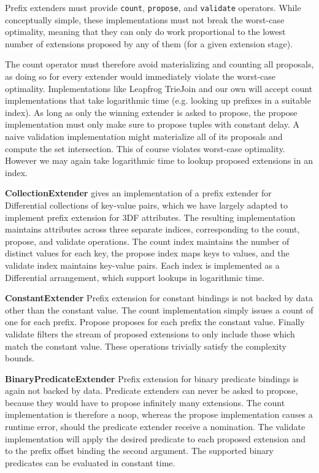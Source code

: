 \documentclass[../index.tex]{subfiles}
\begin{document}
Prefix extenders must provide \texttt{count}, \texttt{propose}, and
\texttt{validate} operators. While conceptually simple, these
implementations must not break the worst-case optimality, meaning that
they can only do work proportional to the lowest number of extensions
proposed by any of them (for a given extension stage).

The count operator must therefore avoid materializing and counting all
proposals, as doing so for every extender would immediately violate
the worst-case optimality. Implementations like Leapfrog TrieJoin and
our own will accept count implementations that take logarithmic time
(e.g. looking up prefixes in a suitable index). As long as only the
winning extender is asked to propose, the propose implementation must
only make sure to propose tuples with constant delay. A naive
validation implementation might materialize all of its proposals and
compute the set intersection. This of course violates worst-case
optimality. However we may again take logarithmic time to lookup
proposed extensions in an index.

\textbf{CollectionExtender} \cite{dogsdogsdogs} gives an
implementation of a prefix extender for Differential collections of
key-value pairs, which we have largely adapted to implement prefix
extension for 3DF attributes. The resulting implementation maintains
attributes across three separate indices, corresponding to the count,
propose, and validate operations. The count index maintains the number
of distinct values for each key, the propose index maps keys to
values, and the validate index maintains key-value pairs. Each index
is implemented as a Differential arrangement, which support lookups in
logarithmic time.

\textbf{ConstantExtender} Prefix extension for constant bindings is
not backed by data other than the constant value. The count
implementation simply issues a count of one for each prefix. Propose
proposes for each prefix the constant value. Finally validate filters
the stream of proposed extensions to only include those which match
the constant value. These operations trivially satisfy the complexity
bounds.

\textbf{BinaryPredicateExtender} Prefix extension for binary predicate
bindings is again not backed by data. Predicate extenders can never be
asked to propose, because they would have to propose infinitely many
extensions. The count implementation is therefore a noop, whereas the
propose implementation causes a runtime error, should the predicate
extender receive a nomination. The validate implementation will apply
the desired predicate to each proposed extension and to the prefix
offset binding the second argument. The supported binary predicates
can be evaluated in constant time.
\end{document}
